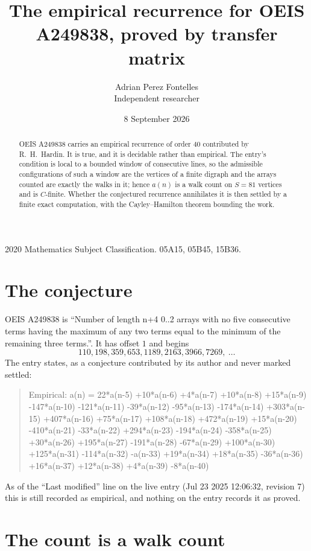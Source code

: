 \documentclass[11pt,a4paper]{article}
\title{The empirical recurrence for OEIS A249838, proved by transfer matrix}
\author{Adrian Perez Fontelles\\ \small Independent researcher}
\date{8 September 2026}
\theoremstyle{plain}
\theoremstyle{definition}
\begin{document}
\maketitle

\begin{abstract}
OEIS A249838 carries an empirical recurrence of order $40$ contributed by R.~H.~Hardin. It is
true, and it is decidable rather than empirical. The entry's condition is local to a bounded window of consecutive lines, so
the admissible configurations of such a window are the vertices of a finite digraph and the
arrays counted are exactly the walks in it; hence $a(n)$ is a walk count on $S=81$ vertices
and is $C$-finite. Whether the conjectured recurrence annihilates it is then settled by a
finite exact computation, with the Cayley--Hamilton theorem bounding the work.
\end{abstract}

\noindent\small 2020 Mathematics Subject Classification. 05A15, 05B45, 15B36.\normalsize

\section{The conjecture}

OEIS A249838 is ``Number of length n+4 0..2 arrays with no five consecutive terms having the maximum of any two terms equal to the minimum of the remaining three terms.''. It has offset $1$ and begins
\[
110, 198, 359, 653, 1189, 2163, 3966, 7269,\ \dots
\]
The entry states, as a conjecture contributed by its author and never marked settled:
\begin{quote}
Empirical: a(n) = 22*a(n-5) +10*a(n-6) +4*a(n-7) +10*a(n-8) +15*a(n-9) -147*a(n-10) -121*a(n-11) -39*a(n-12) -95*a(n-13) -174*a(n-14) +303*a(n-15) +407*a(n-16) +75*a(n-17) +108*a(n-18) +472*a(n-19) +15*a(n-20) -410*a(n-21) -33*a(n-22) +294*a(n-23) -194*a(n-24) -358*a(n-25) +30*a(n-26) +195*a(n-27) -191*a(n-28) -67*a(n-29) +100*a(n-30) +125*a(n-31) -114*a(n-32) -a(n-33) +19*a(n-34) +18*a(n-35) -36*a(n-36) +16*a(n-37) +12*a(n-38) +4*a(n-39) -8*a(n-40)
\end{quote}
As of the ``Last modified'' line on the live entry (Jul 23 2025 12:06:32, revision 7) this is still
recorded as empirical, and nothing on the entry records it as proved.

\section{The count is a walk count}
\end{document}
